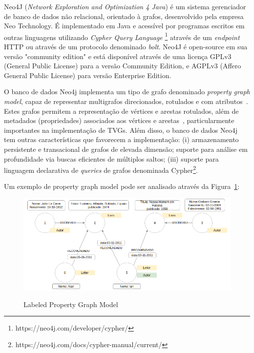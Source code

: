 Neo4J (\emph{Network Exploration and Optimization 4 Java}) é um sistema gerenciador de banco de dados não relacional, orientado à grafos, desenvolvido pela empresa Neo Technology. É implementado em Java e acessível por programas escritos em outras linguagens utilizando \emph{Cypher Query Language} \footnote{https://neo4j.com/developer/cypher/} através de um \emph{endpoint} HTTP ou através de um protocolo denominado \emph{bolt}.
Neo4J é open-source em sua versão "community edition" e está disponível através de uma licença  GPLv3 (General Public License) para a versão Community Edition, e AGPLv3 (Affero General Public License) para versão Enterprise Edition.

O banco de dados Neo4j implementa um tipo de grafo denominado \emph{property graph model}, capaz de representar multigrafos direcionados, rotulados e com atributos~\cite{bruggen:2014}. Estes grafos permitem a representação de vértices e arestas rotulados, além de metadados (propriedades) associados aos vértices e arestas~\cite{rod:10}, particularmente importantes na implementação de TVGs. Além disso, o banco de dados Neo4j tem outras características que favorecem a implementação: (i) armazenamento persistente e transacional de grafos de elevada dimensão; suporte para análise em profundidade via buscas eficientes de múltiplos saltos; (iii) suporte para linguagem declarativa de \emph{queries} de grafos denominada Cypher\footnote{https://neo4j.com/docs/cypher-manual/current/}.

Um exemplo de property graph model pode ser analisado através da Figura~\ref{fig:propertygraphmodel}:

 \begin{figure}[!h]
 \caption{Labeled Property Graph Model}
     \centering
     \includegraphics[scale=.50]{./Capitulo3/img/labeled-property-graph-model.png}
         \label{fig:propertygraphmodel}
 \end{figure}
 
